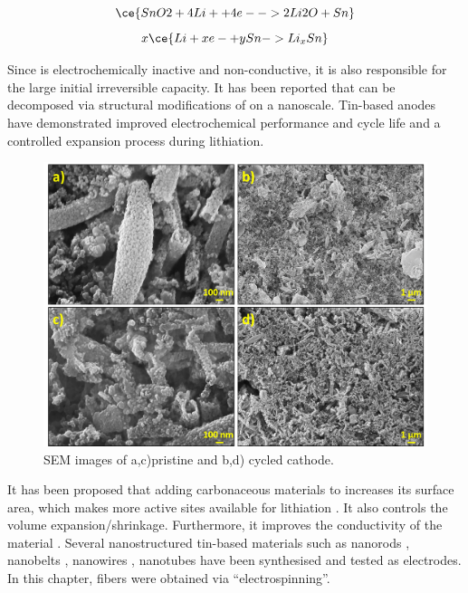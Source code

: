 \begin{equation}
\ce{SnO2 + 4Li+ + 4e- -> 2Li2O + Sn} 
\end{equation}
\begin{equation}
x\ce{Li + xe- + ySn -> Li_{x}Sn} 
\end{equation}

Since  is electrochemically inactive and non-conductive, it is also responsible for the large initial irreversible capacity. It has been reported that  can be decomposed via structural modifications of  on a nanoscale. Tin-based anodes have demonstrated improved electrochemical performance and cycle life and a controlled expansion process during lithiation.  

\begin{figure}[th!]
\centering
\includegraphics[width=\textwidth]{Figures/chap6fig/SnO2SEM}
\caption{SEM images of a,c)pristine and b,d) cycled  cathode.}
\label{Figures/chap6fig:SnO2SEM}
\end{figure}

It has been proposed that adding carbonaceous materials to  increases its surface area, which makes more active sites available for lithiation \cite{navarrosuarez_2d_2018}. It also controls the volume expansion/shrinkage. Furthermore, it improves the conductivity of the material \cite{nowak_composites_2018}. Several nanostructured tin-based materials such as nanorods \cite{liu_direct_2009}, nanobelts \cite{duan_single_2005}, nanowires \cite{huang_situ_2010}, nanotubes \cite{wang_large-scale_2011} have been synthesised and tested as electrodes. In this chapter,  fibers were obtained via  \enquote{electrospinning}. 

